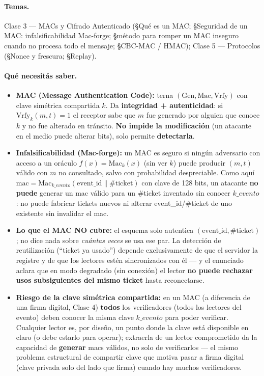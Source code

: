 \paragraph{Temas.}
Clase 3 --- MACs y Cifrado Autenticado (\S Qué es un MAC; \S Seguridad de un MAC:
infalsificabilidad Mac-forge; \S método para romper un MAC inseguro cuando no procesa todo
el mensaje; \S CBC-MAC / HMAC); Clase 5 --- Protocolos (\S Nonce y frescura; \S Replay).

\paragraph{Qué necesitás saber.}
\begin{itemize}
  \item \textbf{MAC (Message Authentication Code):} terna $(\mathrm{Gen},\mathrm{Mac},\mathrm{Vrfy})$
  con clave simétrica compartida $k$. Da \textbf{integridad + autenticidad}: si
  $\mathrm{Vrfy}_k(m,t)=1$ el receptor sabe que $m$ fue generado por alguien que conoce $k$
  y no fue alterado en tránsito. \textbf{No impide la modificación} (un atacante en el medio
  puede alterar bits), solo permite \textbf{detectarla}.
  \item \textbf{Infalsificabilidad (Mac-forge):} un MAC es seguro si ningún adversario con
  acceso a un oráculo $f(x)=\mathrm{Mac}_k(x)$ (sin ver $k$) puede producir $(m,t)$ válido con
  $m$ no consultado, salvo con probabilidad despreciable. Como aquí $\mathrm{mac}=
  \mathrm{Mac}_{k\_evento}(\text{event\_id}\|\text{\#ticket})$ con clave de 128 bits, un
  atacante \textbf{no puede} generar un mac válido para un \#ticket inventado sin conocer
  $k\_evento$: no puede fabricar tickets nuevos ni alterar event\_id/\#ticket de uno
  existente sin invalidar el mac.
  \item \textbf{Lo que el MAC NO cubre:} el esquema solo autentica $(\text{event\_id},
  \#\text{ticket})$; no dice nada sobre \emph{cuántas veces} se usa ese par. La detección de
  reutilización (``ticket ya usado'') depende exclusivamente de que el servidor la registre
  y de que los lectores estén sincronizados con él --- y el enunciado aclara que en modo
  degradado (sin conexión) el lector \textbf{no puede rechazar usos subsiguientes del mismo
  ticket} hasta reconectarse.
  \item \textbf{Riesgo de la clave simétrica compartida:} en un MAC (a diferencia de una
  firma digital, Clase 4) \textbf{todos} los verificadores (todos los lectores del evento)
  deben conocer la misma clave $k\_evento$ para poder verificar. Cualquier lector es, por
  diseño, un punto donde la clave está disponible en claro (o debe estarlo para operar);
  extraerla de un lector comprometido da la capacidad de \textbf{generar} macs válidos, no
  solo de verificarlos --- el mismo problema estructural de compartir clave que motiva pasar
  a firma digital (clave privada solo del lado que firma) cuando hay muchos verificadores.
\end{itemize}

